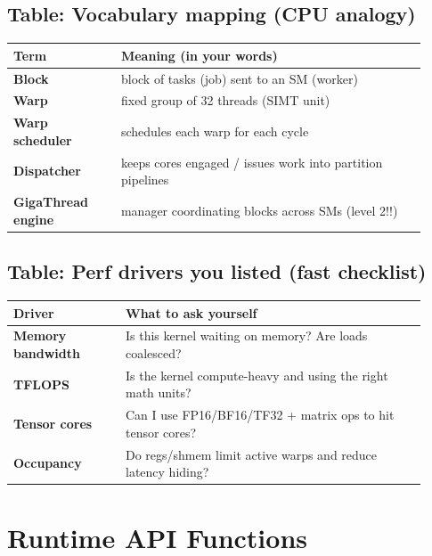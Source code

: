\documentclass[11pt]{article}
\newcommand{\blue}[1]{\textcolor{myblue}{#1}}
\newcommand{\red}[1]{\textcolor{myred}{#1}}
\begin{document}
\subsection*{\blue{Table: Vocabulary mapping (CPU analogy)}}
\begin{center}
\renewcommand{\arraystretch}{1.15}
\begin{tabular}{|>{\bfseries}p{0.24\linewidth}|p{0.68\linewidth}|}
\hline
Term & Meaning (in your words) \\
\hline
Block & block of tasks (job) sent to an SM (worker) \\
\hline
Warp & fixed group of \red{32 threads} (SIMT unit) \\
\hline
Warp scheduler & schedules each warp for each cycle \\
\hline
Dispatcher & keeps cores engaged / issues work into partition pipelines \\
\hline
GigaThread engine & manager coordinating blocks across SMs (\red{level 2!!}) \\
\hline
\end{tabular}
\end{center}

\subsection*{\blue{Table: Perf drivers you listed (fast checklist)}}
\begin{center}
\renewcommand{\arraystretch}{1.15}
\begin{tabular}{|>{\bfseries}p{0.25\linewidth}|p{0.67\linewidth}|}
\hline
Driver & What to ask yourself \\
\hline
Memory bandwidth & Is this kernel waiting on memory? Are loads coalesced? \\
\hline
TFLOPS & Is the kernel compute-heavy and using the right math units? \\
\hline
Tensor cores & Can I use FP16/BF16/TF32 + matrix ops to hit tensor cores? \\
\hline
Occupancy & Do regs/shmem limit active warps and reduce latency hiding? \\
\hline
\end{tabular}
\end{center}

\section{Runtime API Functions}
\end{document}
